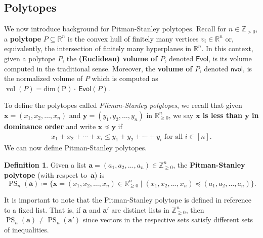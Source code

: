 \documentclass{amsart}
\theoremstyle{definition}
\newtheorem{corollary}[theorem]{Corollary}
\newtheorem{definition}[theorem]{Definition}
\numberwithin{equation}{section}
\newcommand{\Evol}{\textsf{Evol}} %
\newcommand{\nvol}{\textsf{nvol}} %
\newcommand{\PS}{\operatorname{PS}} %
\begin{document}

\subsection{Polytopes}\label{sec:polytope_background_short_paper}
We now introduce background for Pitman-Stanley polytopes.
Recall for $n \in \mathbb{Z}_{>0}$, a \textbf{polytope} $P \subseteq \mathbb{R}^n$ is the convex hull of finitely many vertices $v_i \in \mathbb{R}^n$ or, equivalently, the intersection of finitely many hyperplanes in $\mathbb{R}^n$. 
In this context, given a polytope $P$, the \textbf{(Euclidean) volume of $P$}, denoted $\Evol$, is its volume computed in the traditional sense.
Moreover, the \textbf{volume of $P$}, denoted $\nvol$, is the normalized volume of $P$ which is computed as $\operatorname{vol}(P) = \operatorname{dim(P)} \cdot ~ \Evol(P)$. 

To define the polytopes called \textit{Pitman-Stanley polytopes}, we recall that 
given 
     $\mathbf{x} = (x_1, x_2, \hdots, x_n)$ and $\mathbf{y} = (y_1, y_2, \hdots, y_n)$ in $\mathbb{R}_{\geq 0}^n$, 
    we say \textbf{$\mathbf{x}$ is less than $\mathbf{y}$ in dominance order} and write $\mathbf{x} \preceq \mathbf{y}$ if 
    \begin{align}
        \mbox{$x_1 + x_2 + \cdots + x_i \leq y_1 + y_2 + \cdots + y_i$ for all $i\in[n]$.}
    \end{align}
We can now define Pitman-Stanley polytopes.
\begin{definition}
    Given a list $\mathbf{a} = (a_1, a_2, \hdots, a_n) \in \mathbb{Z}_{\geq 0}^n$, the \textbf{Pitman-Stanley polytope} (with respect to~$\mathbf{a}$) is 
    \[
    \PS_n(\mathbf{a}) \coloneqq \{ \mathbf{x} = (x_1, x_2, \hdots, x_n) \in \mathbb{R}_{\geq 0}^n \; | \; (x_1, x_2, \hdots, x_n) \preceq (a_1, a_2, \hdots, a_n)\}.
    \]
\end{definition}

It is important to note that the Pitman-Stanley polytope is defined in reference to a fixed list.
That is, if $\mathbf{a}$ and $\mathbf{a'}$ are distinct lists in $\mathbb{Z}_{\geq 0}^n$, then $\PS_n(\mathbf{a}) \neq \PS_n(\mathbf{a'})$ since vectors in the respective sets satisfy different sets of inequalities.
\end{document}
